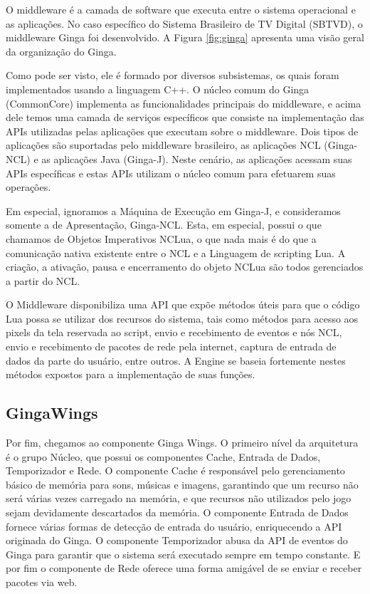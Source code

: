 \documentclass[
	12pt,				%
	openright,			%
	oneside,			%
	a4paper,			%
	brazil,				%
	]{abntex2}
\begin{document}
O middleware é a camada de software que executa entre o sistema operacional e as aplicações. No caso específico do Sistema Brasileiro de TV Digital (SBTVD), o middleware Ginga foi desenvolvido. A Figura \ref{fig:ginga} apresenta uma visão geral da organização do Ginga. 

Como pode ser visto, ele é formado por diversos subsistemas, os quais foram implementados usando a linguagem C++. O núcleo comum do Ginga (CommonCore) implementa as funcionalidades principais do middleware, e acima dele temos uma camada de serviços específicos que consiste na implementação das APIs utilizadas pelas aplicações que executam sobre o middleware. Dois tipos de aplicações são suportadas pelo middleware brasileiro, as aplicações NCL (Ginga-NCL) e as aplicações Java (Ginga-J). Neste cenário, as aplicações acessam suas APIs específicas e estas APIs utilizam o núcleo comum para efetuarem suas operações. 

Em especial, ignoramos a Máquina de Execução em Ginga-J, e consideramos somente a de Apresentação, Ginga-NCL. Esta, em especial, possui o que chamamos de Objetos Imperativos NCLua, o que nada mais é do que a comunicação nativa existente entre o NCL e a Linguagem de scripting Lua. A criação, a ativação, pausa e encerramento do objeto NCLua são todos gerenciados a partir do NCL. 

O Middleware disponibiliza uma API que expõe métodos úteis para que o código Lua possa se utilizar dos recursos do sistema, tais como métodos para acesso aos pixels da tela reservada ao script, envio e recebimento de eventos e nós NCL, envio e recebimento de pacotes de rede pela internet, captura de entrada de dados da parte do usuário, entre outros. A Engine se baseia fortemente nestes métodos expostos para a implementação de suas funções.

\subsection{GingaWings}

Por fim, chegamos ao componente Ginga Wings. O primeiro nível da arquitetura é o grupo Núcleo, que possui os componentes Cache, Entrada de Dados, Temporizador e Rede. O componente Cache é responsável pelo gerenciamento básico de memória para sons, músicas e imagens, garantindo que um recurso não será várias vezes carregado na memória, e que recursos não utilizados pelo jogo sejam devidamente descartados da memória. O componente Entrada de Dados fornece várias formas de detecção de entrada do usuário, enriquecendo a API originada do Ginga. O componente Temporizador abusa da API de eventos do Ginga para garantir que o sistema será executado sempre em tempo constante. E por fim o componente de Rede oferece uma forma amigável de se enviar e receber pacotes via web.
\end{document}
